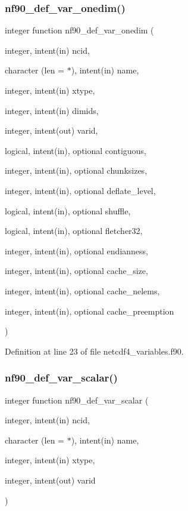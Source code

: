 \subsubsection{\texorpdfstring{nf90\+\_\+def\+\_\+var\+\_\+onedim()}{nf90\_def\_var\_onedim()}}
{\footnotesize\ttfamily integer function nf90\+\_\+def\+\_\+var\+\_\+onedim (\begin{DoxyParamCaption}\item[{integer, intent(in)}]{ncid,  }\item[{character (len = $\ast$), intent(in)}]{name,  }\item[{integer, intent(in)}]{xtype,  }\item[{integer, intent(in)}]{dimids,  }\item[{integer, intent(out)}]{varid,  }\item[{logical, intent(in), optional}]{contiguous,  }\item[{integer, intent(in), optional}]{chunksizes,  }\item[{integer, intent(in), optional}]{deflate\+\_\+level,  }\item[{logical, intent(in), optional}]{shuffle,  }\item[{logical, intent(in), optional}]{fletcher32,  }\item[{integer, intent(in), optional}]{endianness,  }\item[{integer, intent(in), optional}]{cache\+\_\+size,  }\item[{integer, intent(in), optional}]{cache\+\_\+nelems,  }\item[{integer, intent(in), optional}]{cache\+\_\+preemption }\end{DoxyParamCaption})}



Definition at line 23 of file netcdf4\+\_\+variables.\+f90.

\mbox{\label{netcdf4__variables_8f90_ab4e65fef4873720b23fc10d39d167def}} 
\subsubsection{\texorpdfstring{nf90\+\_\+def\+\_\+var\+\_\+scalar()}{nf90\_def\_var\_scalar()}}
{\footnotesize\ttfamily integer function nf90\+\_\+def\+\_\+var\+\_\+scalar (\begin{DoxyParamCaption}\item[{integer, intent(in)}]{ncid,  }\item[{character (len = $\ast$), intent(in)}]{name,  }\item[{integer, intent(in)}]{xtype,  }\item[{integer, intent(out)}]{varid }\end{DoxyParamCaption})}



